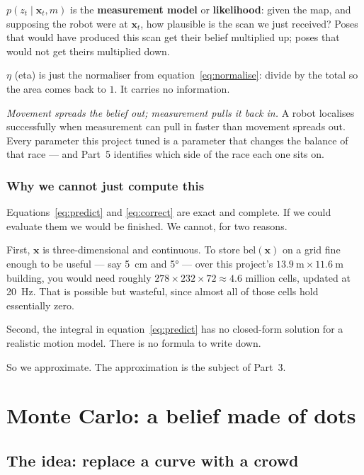 \documentclass[11pt,a4paper]{report}
\newcommand{\term}[1]{\textcolor{rust}{\textbf{#1}}}
\newcommand{\xt}{\mathbf{x}}
\begin{document}
$p(z_t \mid \xt_t, m)$ is the \term{measurement model} or \term{likelihood}:
given the map, and supposing the robot were at $\xt_t$, how plausible is the
scan we just received? Poses that would have produced this scan get their
belief multiplied up; poses that would not get theirs multiplied down.

$\eta$ (eta) is just the normaliser from equation~\eqref{eq:normalise}: divide
by the total so the area comes back to $1$. It carries no information.

\begin{keyidea}
\emph{Movement spreads the belief out; measurement pulls it back in.} A robot
localises successfully when measurement can pull in faster than movement
spreads out. Every parameter this project tuned is a parameter that changes the
balance of that race --- and Part~5 identifies which side of the race each one
sits on.
\end{keyidea}

\subsection{Why we cannot just compute this}

Equations~\eqref{eq:predict} and \eqref{eq:correct} are exact and complete. If
we could evaluate them we would be finished. We cannot, for two reasons.

First, $\xt$ is three-dimensional and continuous. To store
$\mathrm{bel}(\xt)$ on a grid fine enough to be useful --- say
\SI{5}{\centi\metre} and \ang{5} --- over this project's
$\SI{13.9}{\metre} \times \SI{11.6}{\metre}$ building, you would need roughly
$278 \times 232 \times 72 \approx 4.6$ million cells, updated at
\SI{20}{\hertz}. That is possible but wasteful, since almost all of those
cells hold essentially zero.

Second, the integral in equation~\eqref{eq:predict} has no closed-form
solution for a realistic motion model. There is no formula to write down.

So we approximate. The approximation is the subject of Part~3.

\chapter{Monte Carlo: a belief made of dots}
\label{ch:mc}

\section{The idea: replace a curve with a crowd}
\end{document}
